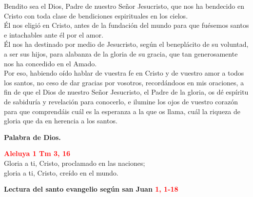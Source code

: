 \documentclass[12pt, letterpaper]{report}
\begin{document}
\Large Bendito sea el Dios, Padre de nuestro Se\~nor Jesucristo, que nos ha bendecido en Cristo con toda clase de bendiciones espirituales en los cielos. \\
\'El nos eligi\'o en Cristo, antes de la fundaci\'on del mundo para que fu\'esemos santos e intachables ante \'el por el amor. \\
\'El nos ha destinado por medio de Jesucristo, seg\'un el benepl\'acito de su voluntad, a ser sus hijos, para alabanza de la gloria de su gracia, que tan generosamente nos ha concedido en el Amado. \\
Por eso, habiendo o\'ido hablar de vuestra fe en Cristo y de vuestro amor a todos los santos, no ceso de dar gracias por vosotros, record\'andoos en mis oraciones, a fin de que el Dios de nuestro Se\~nor Jesucristo, el Padre de la gloria, os d\'e esp\'iritu de sabidur\'ia y revelaci\'on para conocerlo, e ilumine los ojos de vuestro coraz\'on para que comprend\'ais cu\'al es la esperanza a la que os llama, cu\'al la riqueza de gloria que da en herencia a los santos. \newline

{\bfseries Palabra de Dios.} \newline

\begin{center}
\Large {\bfseries \textcolor{red}{Aleluya \hspace{1cm} 1 Tm 3, 16}} \\
Gloria a ti, Cristo, proclamado en las naciones; \\
gloria a ti, Cristo, cre\'ido en el mundo.
\end{center}

\newpage

\Huge \textcolor{red}{} \Large {\bfseries Lectura del santo evangelio seg\'un san Juan \hspace{1cm} \textcolor{red}{1, 1-18}} \newline
\end{document}
